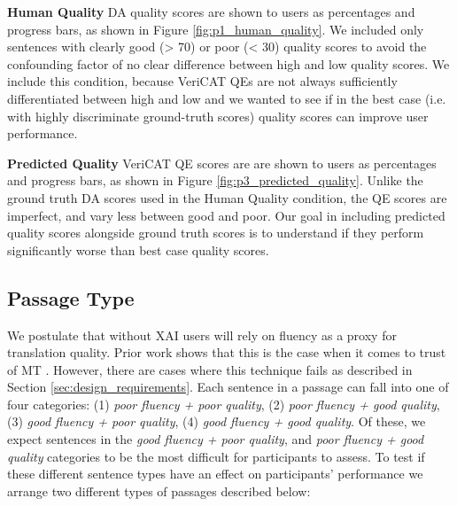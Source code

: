 \begin{compacthang}
    \item \textbf{Human Quality} DA quality scores are shown to users as percentages and progress bars, as shown in Figure \ref{fig:p1_human_quality}. We included only sentences with clearly good (> 70) or poor (< 30) quality scores to avoid the confounding factor of no clear difference between high and low quality scores. We include this condition, because VeriCAT QEs are not always sufficiently differentiated between high and low and we wanted to see if in the best case (i.e. with highly discriminate ground-truth scores) quality scores can improve user performance.  

    \item \textbf{Predicted Quality} VeriCAT QE scores are are shown to users as percentages and progress bars, as shown in Figure \ref{fig:p3_predicted_quality}.
    Unlike the ground truth DA scores used in the Human Quality condition, the QE scores are imperfect, and vary less between good and poor. Our goal in including predicted quality scores alongside ground truth scores is to understand if they perform significantly worse than best case quality scores. 
    
\end{compacthang}

\subsection{Passage Type}
We postulate that without XAI users will rely on fluency as a proxy for translation quality. Prior work shows that this is the case when it comes to trust of MT \cite{martindaleFluency2018}. However, there are cases where this technique fails as described in Section \ref{sec:design_requirements}.  
Each sentence in a passage can fall into one of four categories: (1) \textit{poor fluency + poor quality}, (2) \textit{poor fluency + good quality}, (3) \textit{good fluency + poor quality}, (4) \textit{good fluency + good quality}. Of these, we expect  sentences in the \textit{good fluency + poor quality}, and \textit{poor fluency + good quality} categories to be the most difficult for participants to assess. To test if these different sentence types have an effect on participants’ performance we arrange two different types of passages described below: 

